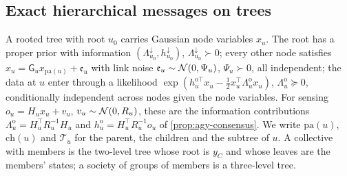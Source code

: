 \subsection{Exact hierarchical messages on trees}\label{sec:hie-messages}

\begin{definition}\label{def:hie-tree}
A rooted tree with root $u_0$ carries Gaussian node variables $x_u$. The root has a proper prior with information $(\Lambda^\downarrow_{u_0},h^\downarrow_{u_0})$, $\Lambda^\downarrow_{u_0}\succ0$; every other node satisfies $x_u=\mathsf G_ux_{\mathrm{pa}(u)}+\mathfrak e_u$ with link noise $\mathfrak e_u\sim\mathcal{N}(0,\Psi_u)$, $\Psi_u\succ0$, all independent; the data at $u$ enter through a likelihood $\exp(h^{\mathrm o\top}_ux_u-\frac12x_u^\top\Lambda^{\mathrm o}_ux_u)$, $\Lambda^{\mathrm o}_u\succeq0$, conditionally independent across nodes given the node variables. For sensing $o_u=H_ux_u+v_u$, $v_u\sim\mathcal{N}(0,R_u)$, these are the information contributions $\Lambda^{\mathrm o}_u=H_u^\top R_u^{-1}H_u$ and $h^{\mathrm o}_u=H_u^\top R_u^{-1}o_u$ of \cref{prop:agy-consensus}. We write $\mathrm{pa}(u)$, $\mathrm{ch}(u)$ and $\mathcal T_u$ for the parent, the children and the subtree of $u$. A collective with members is the two-level tree whose root is $y_C$ and whose leaves are the members' states; a society of groups of members is a three-level tree.
\end{definition}

